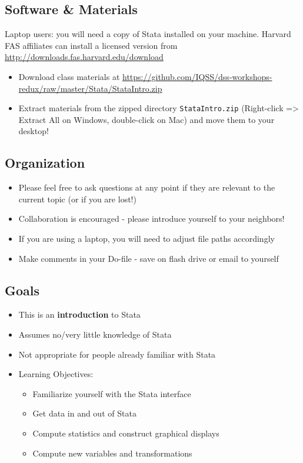 \documentclass[]{book}
\providecommand{\tightlist}{%
  \setlength{\itemsep}{0pt}\setlength{\parskip}{0pt}}
\begin{document}
\subsection{Software \& Materials}\label{software-materials-6}

Laptop users: you will need a copy of Stata installed on your machine.
Harvard FAS affiliates can install a licensed version from
\url{http://downloads.fas.harvard.edu/download}

\begin{itemize}
\tightlist
\item
  Download class materials at
  \url{https://github.com/IQSS/dss-workshops-redux/raw/master/Stata/StataIntro.zip}
\item
  Extract materials from the zipped directory \texttt{StataIntro.zip}
  (Right-click =\textgreater{} Extract All on Windows, double-click on
  Mac) and move them to your desktop!
\end{itemize}

\subsection{Organization}\label{organization}

\begin{itemize}
\tightlist
\item
  Please feel free to ask questions at any point if they are relevant to
  the current topic (or if you are lost!)
\item
  Collaboration is encouraged - please introduce yourself to your
  neighbors!
\item
  If you are using a laptop, you will need to adjust file paths
  accordingly
\item
  Make comments in your Do-file - save on flash drive or email to
  yourself
\end{itemize}

\subsection{Goals}\label{goals-5}

\begin{itemize}
\tightlist
\item
  This is an \textbf{introduction} to Stata
\item
  Assumes no/very little knowledge of Stata
\item
  Not appropriate for people already familiar with Stata
\item
  Learning Objectives:

  \begin{itemize}
  \tightlist
  \item
    Familiarize yourself with the Stata interface
  \item
    Get data in and out of Stata
  \item
    Compute statistics and construct graphical displays
  \item
    Compute new variables and transformations
  \end{itemize}
\end{itemize}
\end{document}
